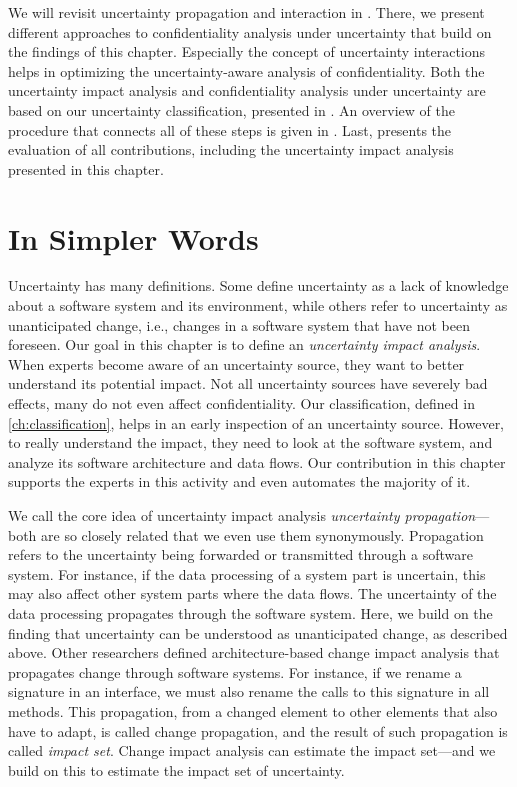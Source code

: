 We will revisit uncertainty propagation and interaction in .
There, we present different approaches to confidentiality analysis under uncertainty that build on the findings of this chapter.
Especially the concept of uncertainty interactions helps in optimizing the uncertainty-aware analysis of confidentiality.
Both the uncertainty impact analysis and confidentiality analysis under uncertainty are based on our uncertainty classification, presented in .
An overview of the procedure that connects all of these steps is given in .
Last,  presents the evaluation of all contributions, including the uncertainty impact analysis presented in this chapter.





\section{In Simpler Words}%
\label{sec:impactanalysis:simple}

Uncertainty has many definitions.
Some define uncertainty as a lack of knowledge about a software system and its environment, while others refer to uncertainty as unanticipated change, i.e., changes in a software system that have not been foreseen.
Our goal in this chapter is to define an \emph{uncertainty impact analysis}.
When experts become aware of an uncertainty source, they want to better understand its potential impact.
Not all uncertainty sources have severely bad effects, many do not even affect confidentiality.
Our classification, defined in \autoref{ch:classification}, helps in an early inspection of an uncertainty source.
However, to really understand the impact, they need to look at the software system, and analyze its software architecture and data flows.
Our contribution in this chapter supports the experts in this activity and even automates the majority of it.

We call the core idea of uncertainty impact analysis \emph{uncertainty propagation}---both are so closely related that we even use them synonymously.
Propagation refers to the uncertainty being forwarded or transmitted through a software system.
For instance, if the data processing of a system part is uncertain, this may also affect other system parts where the data flows.
The uncertainty of the data processing propagates through the software system.
Here, we build on the finding that uncertainty can be understood as unanticipated change, as described above.
Other researchers defined architecture-based change impact analysis that propagates change through software systems.
For instance, if we rename a signature in an interface, we must also rename the calls to this signature in all methods.
This propagation, from a changed element to other elements that also have to adapt, is called change propagation, and the result of such propagation is called \emph{impact set}.
Change impact analysis can estimate the impact set---and we build on this to estimate the impact set of uncertainty.

